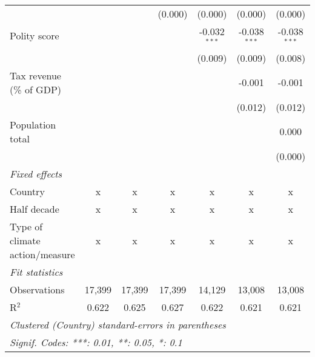 \begin{tabular}{lcccccc}
                                                                           &                &               & (0.000)       & (0.000)        & (0.000)        & (0.000)\\   
   Polity score                                                            &                &               &               & -0.032$^{***}$ & -0.038$^{***}$ & -0.038$^{***}$\\   
                                                                           &                &               &               & (0.009)        & (0.009)        & (0.008)\\   
   Tax revenue (\% of GDP)                                                 &                &               &               &                & -0.001         & -0.001\\   
                                                                           &                &               &               &                & (0.012)        & (0.012)\\   
   Population total                                                        &                &               &               &                &                & 0.000\\   
                                                                           &                &               &               &                &                & (0.000)\\   
   \emph{Fixed effects}\\
   Country                                                                 & x              & x             & x             & x              & x              & x\\  
   Half decade                                                             & x              & x             & x             & x              & x              & x\\  
   Type of climate action/measure                                          & x              & x             & x             & x              & x              & x\\  
   \midrule \emph{Fit statistics}\\
   Observations                                                            & 17,399         & 17,399        & 17,399        & 14,129         & 13,008         & 13,008\\  
   R$^2$                                                                   & 0.622          & 0.625         & 0.627         & 0.622          & 0.621          & 0.621\\  
   \midrule
   \multicolumn{7}{l}{\emph{Clustered (Country) standard-errors in parentheses}}\\
   \multicolumn{7}{l}{\emph{Signif. Codes: ***: 0.01, **: 0.05, *: 0.1}}\\
\end{tabular}
\par\endgroup


